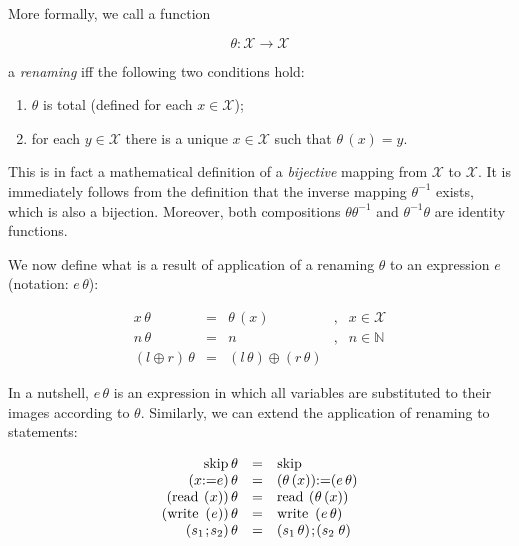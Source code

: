 More formally, we call a function

\[
\theta : \mathscr{X}\to\mathscr{X}
\]

a \emph{renaming} iff the following two conditions hold:

\begin{enumerate}
\item $\theta$ is total (defined for each $x\in\mathscr{X}$);
\item for each $y\in\mathscr{X}$ there is a unique $x\in\mathscr{X}$ such that $\theta\,(x)=y$.
\end{enumerate}

This is in fact a mathematical definition of a \emph{bijective} mapping from $\mathscr{X}$ to $\mathscr{X}$.
It is immediately follows from the definition that the inverse mapping $\theta^{-1}$ exists, which is
also a bijection. Moreover, both compositions $\theta\theta^{-1}$ and $\theta^{-1}\theta$ are identity
functions.

We now define what is a result of application of a renaming $\theta$ to an expression $e$ (notation: $e\,\theta$):

\[
\begin{array}{rclcl}
  x\,\theta&=&\theta\,(x)&,&x\in\mathscr{X}\\
  n\,\theta&=&n&,&n\in\mathbb{N}\\
  (l\oplus r)\,\theta&=&(l\,\theta)\oplus(r\,\theta)&
\end{array}
\]

In a nutshell, $e\,\theta$ is an expression in which all variables are substituted to their images according to $\theta$.
Similarly, we can extend the application of renaming to statements:

\[
\begin{array}{rcl}
  \llang{skip}\,\theta&=&\llang{skip}\\
  (x\llang{:=}e)\,\theta&=&(\theta\,(x))\llang{:=}(e\,\theta)\\
  (\llang{read ($x$)})\,\theta&=&\llang{read ($\theta\,(x)$)}\\
  (\llang{write ($e$)})\,\theta&=&\llang{write ($e\,\theta$)}\\
  (s_1\llang{;}s_2)\,\theta&=&(s_1\,\theta)\llang{;}(s_2\;\theta)
\end{array}
\]

